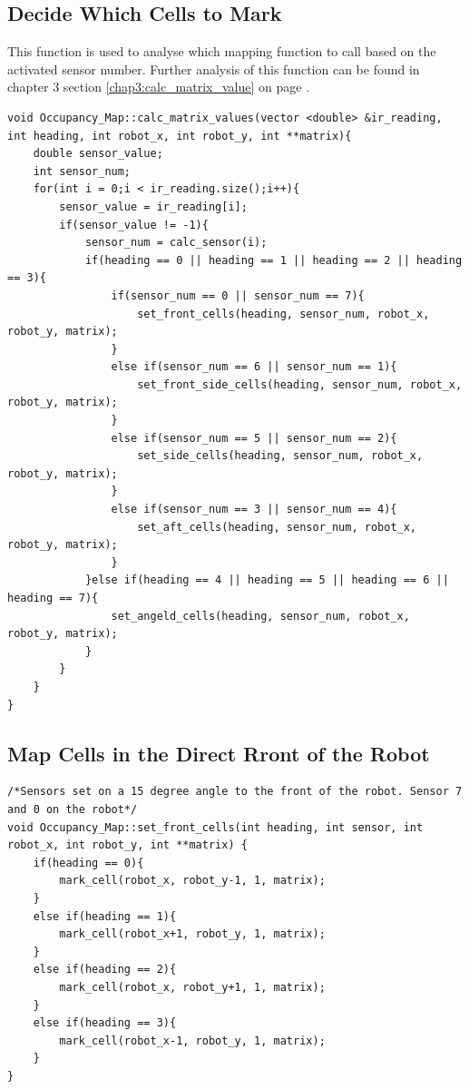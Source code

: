 \subsection{Decide Which Cells to Mark}
\label{code:calc_matrix_values}
This function is used to analyse which mapping function to call based on the activated sensor number. 
Further analysis of this function can be found in chapter 3 section \ref{chap3:calc_matrix_value} on page \pageref{chap3:calc_matrix_value}.
\begin{lstlisting}[caption = {Calculate Which Cells to Mark}]
void Occupancy_Map::calc_matrix_values(vector <double> &ir_reading, int heading, int robot_x, int robot_y, int **matrix){
    double sensor_value;
    int sensor_num;
    for(int i = 0;i < ir_reading.size();i++){
        sensor_value = ir_reading[i];
        if(sensor_value != -1){
            sensor_num = calc_sensor(i);
            if(heading == 0 || heading == 1 || heading == 2 || heading == 3){
                if(sensor_num == 0 || sensor_num == 7){
                    set_front_cells(heading, sensor_num, robot_x, robot_y, matrix);
                }
                else if(sensor_num == 6 || sensor_num == 1){
                    set_front_side_cells(heading, sensor_num, robot_x, robot_y, matrix);
                }
                else if(sensor_num == 5 || sensor_num == 2){
                    set_side_cells(heading, sensor_num, robot_x, robot_y, matrix);
                }
                else if(sensor_num == 3 || sensor_num == 4){
                    set_aft_cells(heading, sensor_num, robot_x, robot_y, matrix);
                }
            }else if(heading == 4 || heading == 5 || heading == 6 || heading == 7){
                set_angeld_cells(heading, sensor_num, robot_x, robot_y, matrix);
            }
        }
    }
}
\end{lstlisting}

\subsection{Map Cells in the Direct Rront of the Robot}
\label{code:set_front}

\begin{lstlisting}[caption = {Code to Set Cells in Front of the Robot}]
/*Sensors set on a 15 degree angle to the front of the robot. Sensor 7 and 0 on the robot*/
void Occupancy_Map::set_front_cells(int heading, int sensor, int robot_x, int robot_y, int **matrix) {
    if(heading == 0){
        mark_cell(robot_x, robot_y-1, 1, matrix);
    }
    else if(heading == 1){
        mark_cell(robot_x+1, robot_y, 1, matrix);
    }
    else if(heading == 2){
        mark_cell(robot_x, robot_y+1, 1, matrix);
    }
    else if(heading == 3){
        mark_cell(robot_x-1, robot_y, 1, matrix);
    }
}
\end{lstlisting}

